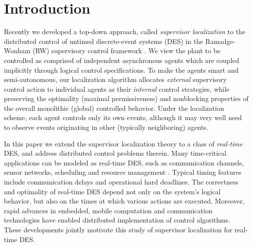 \documentclass[twocolumn]{autart}
\begin{document}
\section{Introduction} \label{sec:intro}

Recently we developed a top-down approach, called \emph{supervisor
localization} \cite{CaiWonham:2010a,CaiWonham:2010b} to the
distributed control of untimed discrete-event systems (DES) in the
Ramadge-Wonham (RW) supervisory control framework
\cite{RamadgeWonham:87,Wonham:2011a}. We view the plant to be
controlled as comprised of independent asynchronous agents which are
coupled implicitly through logical control specifications. To make
the agents smart and semi-autonomous, our localization algorithm
allocates \emph{external} supervisory control action to individual
agents as their \emph{internal} control strategies, while preserving
the optimality (maximal permissiveness) and nonblocking properties
of the overall monolithic (global) controlled behavior. Under the
localization scheme, each agent controls only its own events,
although it may very well need to observe events originating in
other (typically neighboring) agents.

In this paper we extend the supervisor localization theory to a
class of \emph{real-time} DES, and address distributed control
problems therein. Many time-critical applications can be modeled as
real-time DES, such as communication channels, sensor networks,
scheduling and resource management \cite{LeeLeuSon:07}. Typical
timing features include communication delays and operational hard
deadlines. The correctness and optimality of real-time DES depend
not only on the system's logical behavior, but also on the times at
which various actions are executed. Moreover, rapid advances in
embedded, mobile computation and communication technologies
\cite[Part~III]{LeeLeuSon:07} have enabled distributed
implementation of control algorithms.  These developments jointly
motivate this study of supervisor localization for real-time DES.
\end{document}
